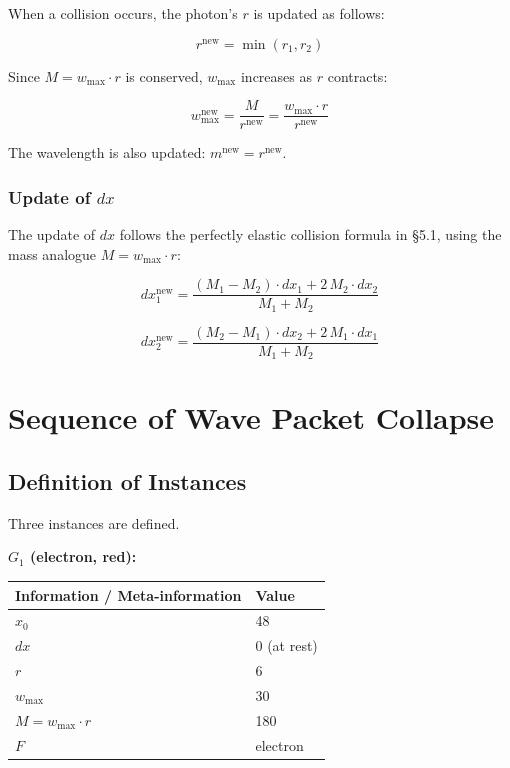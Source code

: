 \documentclass[12pt,a4paper]{article}
\begin{document}
When a collision occurs, the photon's $r$ is updated as follows:

\begin{equation}
  r^{\text{new}} = \min(r_1, r_2)
\end{equation}

Since $M = w_{\max} \cdot r$ is conserved, $w_{\max}$ increases as $r$ contracts:

\begin{equation}
  w_{\max}^{\text{new}} = \frac{M}{r^{\text{new}}} = \frac{w_{\max} \cdot r}{r^{\text{new}}}
\end{equation}

The wavelength is also updated: $m^{\text{new}} = r^{\text{new}}$.

\subsubsection*{Update of $dx$}

The update of $dx$ follows the perfectly elastic collision formula in \cite{ref4} \S5.1, using the mass analogue $M = w_{\max} \cdot r$:

\begin{equation}
  dx_1^{\text{new}} = \frac{(M_1 - M_2) \cdot dx_1 + 2\, M_2 \cdot dx_2}{M_1 + M_2}
\end{equation}

\begin{equation}
  dx_2^{\text{new}} = \frac{(M_2 - M_1) \cdot dx_2 + 2\, M_1 \cdot dx_1}{M_1 + M_2}
\end{equation}

\section{Sequence of Wave Packet Collapse}

\subsection{Definition of Instances}

Three instances are defined.

\textbf{$G_1$ (electron, red):}

\begin{table}[h]
\centering
\begin{tabular}{@{}ll@{}}
\toprule
Information / Meta-information & Value \\
\midrule
$x_0$ & 48 \\
$dx$ & 0 (at rest) \\
$r$ & 6 \\
$w_{\max}$ & 30 \\
$M = w_{\max} \cdot r$ & 180 \\
$F$ & electron \\
\bottomrule
\end{tabular}
\end{table}
\end{document}
